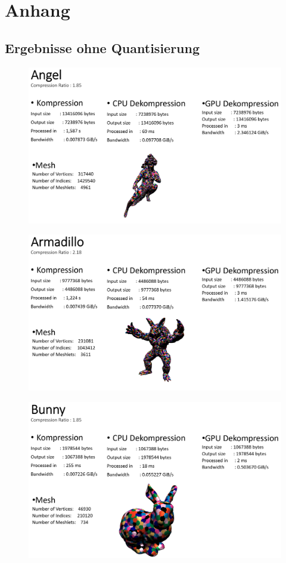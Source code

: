 \section{Anhang}

\subsection{Ergebnisse ohne Quantisierung}
\begin{figure}[h]
  \centering  
  \includegraphics[scale=0.28]{Bilder/ergebnisse_full/angel.png}
\end{figure}
\begin{figure}[h]
  \centering  
  \includegraphics[scale=0.28]{Bilder/ergebnisse_full/armadillo.png}
\end{figure}
\begin{figure}[h]
  \centering  
  \includegraphics[scale=0.28]{Bilder/ergebnisse_full/bunny.png}
\end{figure}

